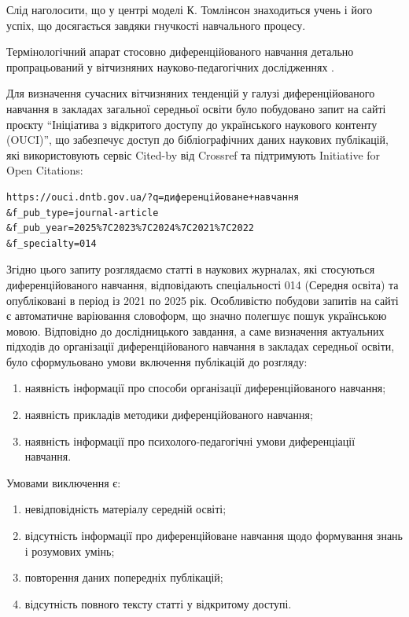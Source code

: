 Слід наголосити, що у центрі моделі К. Томлінсон знаходиться учень і його успіх, що досягається завдяки гнучкості навчального процесу.

Термінологічний апарат стосовно диференційованого навчання детально пропрацьований у вітчизняних науково-педагогічних дослідженнях \cite{Білик2017, ШАРОВ2021, Шевчук_2020, Пісоцька2022}. 

Для визначення сучасних вітчизняних тенденцій у галузі диференційованого навчання в закладах загальної середньої освіти було побудовано запит на сайті  проєкту ``Ініціатива з відкритого доступу до українського наукового контенту (OUCI)'', що забезпечує доступ до бібліографічних даних наукових публікацій, які використовують сервіс Cited-by від Crossref та підтримують Initiative for Open Citations: 

\begin{verbatim}
https://ouci.dntb.gov.ua/?q=диференційоване+навчання
&f_pub_type=journal-article
&f_pub_year=2025%7C2023%7C2024%7C2021%7C2022
&f_specialty=014
\end{verbatim}

Згідно цього запиту розглядаємо статті в наукових журналах, які стосуються диференційованого навчання, відповідають спеціальності 014 (Середня освіта) та опубліковані в період із 2021 по 2025 рік. Особливістю побудови запитів на сайті є автоматичне варіювання словоформ, що значно полегшує пошук українською мовою. Відповідно до дослідницького завдання, а саме визначення актуальних підходів до організації диференційованого навчання в закладах середньої освіти, було сформульовано умови включення публікацій до розгляду:
\begin{enumerate}[label=\arabic*)]
    \item наявність інформації про способи організації диференційованого навчання;
    \item наявність прикладів методики диференційованого навчання;
    \item наявність інформації про психолого-педагогічні умови диференціації навчання.
\end{enumerate}


Умовами виключення є:
\begin{enumerate} [label=\arabic*)]%
\item невідповідність матеріалу середній освіті;
\item відсутність інформації про диференційоване навчання щодо формування знань і розумових умінь;
\item повторення даних попередніх публікацій;
\item відсутність повного тексту статті у відкритому доступі.
\end{enumerate}


